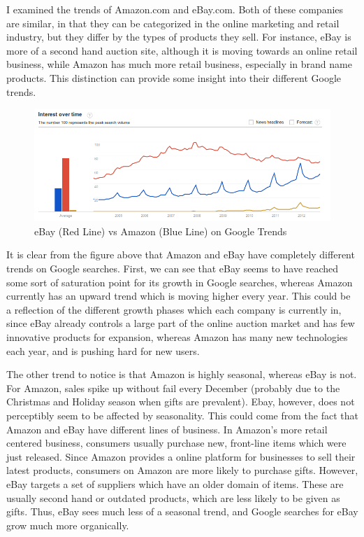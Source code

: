 \documentclass[psamsfonts]{amsart}
\newenvironment{sol}{{\bfseries Solution:}}{\qedsymbol}
\begin{document}
\begin{sol}
I examined the trends of Amazon.com and eBay.com. Both of these companies are similar, in that they can be categorized in the online marketing and retail industry, but they differ by the types of products they sell. For instance, eBay is more of a second hand auction site, although it is moving towards an online retail business, while Amazon has much more retail business, especially in brand name products. This distinction can provide some insight into their different Google trends.

\begin{figure}[h!]
\includegraphics[width=6in]{ebay_vs_amazon.png}
\caption{eBay (Red Line) vs Amazon (Blue Line) on Google Trends}
\end{figure}

It is clear from the figure above that Amazon and eBay have completely different trends on Google searches. First, we can see that eBay seems to have reached some sort of saturation point for its growth in Google searches, whereas Amazon currently has an upward trend which is moving higher every year. This could be a reflection of the different growth phases which each company is currently in, since eBay already controls a large part of the online auction market and has few innovative products for expansion, whereas Amazon has many new technologies each year, and is pushing hard for new users. 

The other trend to notice is that Amazon is highly seasonal, whereas eBay is not. For Amazon, sales spike up without fail every December (probably due to the Christmas and Holiday season when gifts are prevalent). Ebay, however, does not perceptibly seem to be affected by seasonality. This could come from the fact that Amazon and eBay have different lines of business. In Amazon's more retail centered business, consumers usually purchase new, front-line items which were just released. Since Amazon provides a online platform for businesses to sell their latest products, consumers on Amazon are more likely to purchase gifts. However, eBay targets a set of suppliers which have an older domain of items. These are usually second hand or outdated products, which are less likely to be given as gifts. Thus, eBay sees much less of a seasonal trend, and Google searches for eBay grow much more organically.


\end{sol}
\end{document}
